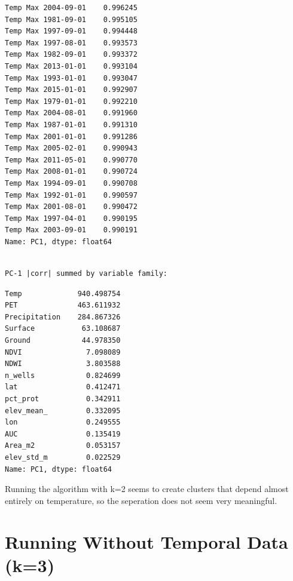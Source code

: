 \documentclass[
  letterpaper,
  DIV=11,
  numbers=noendperiod]{scrreprt}
\begin{document}
\begin{verbatim}
Temp Max 2004-09-01    0.996245
Temp Max 1981-09-01    0.995105
Temp Max 1997-09-01    0.994448
Temp Max 1997-08-01    0.993573
Temp Max 1982-09-01    0.993372
Temp Max 2013-01-01    0.993104
Temp Max 1993-01-01    0.993047
Temp Max 2015-01-01    0.992907
Temp Max 1979-01-01    0.992210
Temp Max 2004-08-01    0.991960
Temp Max 1987-01-01    0.991310
Temp Max 2001-01-01    0.991286
Temp Max 2005-02-01    0.990943
Temp Max 2011-05-01    0.990770
Temp Max 2008-01-01    0.990724
Temp Max 1994-09-01    0.990708
Temp Max 1992-01-01    0.990597
Temp Max 2001-08-01    0.990472
Temp Max 1997-04-01    0.990195
Temp Max 2003-09-01    0.990191
Name: PC1, dtype: float64
\end{verbatim}

\begin{verbatim}

PC-1 |corr| summed by variable family:
\end{verbatim}

\begin{verbatim}
Temp             940.498754
PET              463.611932
Precipitation    284.867326
Surface           63.108687
Ground            44.978350
NDVI               7.098089
NDWI               3.803588
n_wells            0.824699
lat                0.412471
pct_prot           0.342911
elev_mean_         0.332095
lon                0.249555
AUC                0.135419
Area_m2            0.053157
elev_std_m         0.022529
Name: PC1, dtype: float64
\end{verbatim}

Running the algorithm with k=2 seems to create clusters that depend
almost entirely on temperature, so the seperation does not seem very
meaningful.

\chapter{Running Without Temporal Data
(k=3)}\label{running-without-temporal-data-k3}
\end{document}
